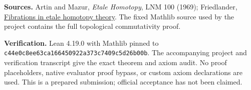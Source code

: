 \documentclass[11pt]{article}
\begin{document}
\textbf{Sources.} Artin and Mazur, \emph{Etale Homotopy}, LNM 100 (1969); Friedlander, \href{https://www.numdam.org/article/PMIHES_1973__42__5_0.pdf}{Fibrations in etale homotopy theory}. The fixed Mathlib source used by the project contains the full topological commutativity proof.


\textbf{Verification.} Lean 4.19.0 with Mathlib pinned to
\texttt{c44e0c8ee63ca166450922a373c7409c5d26b00b}.
The accompanying project and verification transcript give the exact theorem and axiom audit. No proof placeholders, native evaluator proof bypass, or custom axiom declarations are used. This is a prepared submission; official acceptance has not been claimed.
\end{document}
